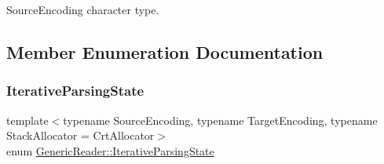 Source\+Encoding character type. 



\subsection{Member Enumeration Documentation}
\mbox{\label{classGenericReader_a269700a68b925db2f3ecc84b75f2277e}} 
\subsubsection{\texorpdfstring{Iterative\+Parsing\+State}{IterativeParsingState}}
{\footnotesize\ttfamily template$<$typename Source\+Encoding, typename Target\+Encoding, typename Stack\+Allocator = Crt\+Allocator$>$ \\
enum \hyperlink{classGenericReader_a269700a68b925db2f3ecc84b75f2277e}{Generic\+Reader\+::\+Iterative\+Parsing\+State}\hspace{0.3cm}{\ttfamily [private]}}

